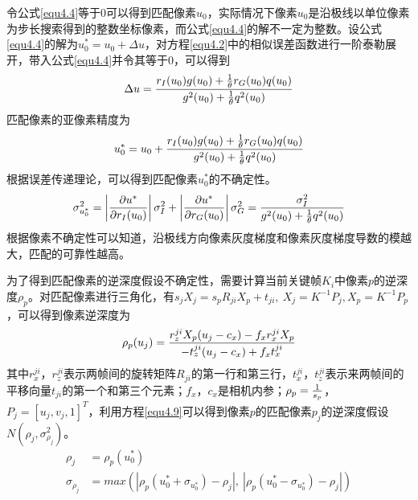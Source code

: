 令公式\eqref{equ4.4}等于$0$可以得到匹配像素$u_0$，实际情况下像素$u_0$是沿极线以单位像素为步长搜索得到的整数坐标像素，而公式\eqref{equ4.4}的解不一定为整数。设公式\eqref{equ4.4}的解为$u_0^*=u_0+\Delta u$，对方程\eqref{equ4.2}中的相似误差函数进行一阶泰勒展开，带入公式\eqref{equ4.4}并令其等于$0$，可以得到
\begin{equation}
\label{equ4.6}
\Delta u = {{ r_I(u_0) g(u_0)+ {1 \over \theta} r_G(u_0)q(u_0) } \over {g^2(u_0)+ { 1 \over \theta} q^2(u_0)}}
\end{equation}
匹配像素的亚像素精度为
\begin{equation}
\label{equ4.7}
u_0^* = u_0 + {{ r_I(u_0) g(u_0)+ {1 \over \theta} r_G(u_0)q(u_0) } \over {g^2(u_0)+ { 1 \over \theta} q^2(u_0)}}
\end{equation}
根据误差传递理论，可以得到匹配像素$u_0^*$的不确定性。
\begin{equation}
\label{equ4.8}
\sigma_{u_0^*}^2 = \left \vert { \partial u^* \over \partial r_I(u_0) }  \right \vert \sigma_I^2 + \left \vert { \partial u^* \over \partial r_G(u_0) }  \right \vert \sigma_G^2 = { \sigma_I^2 \over g^2(u_0) + {1 \over \theta} q^2(u_0) }
\end{equation}
根据像素不确定性可以知道，沿极线方向像素灰度梯度和像素灰度梯度导数的模越大，匹配的可靠性越高。

为了得到匹配像素的逆深度假设不确定性，需要计算当前关键帧$K_i$中像素$p$的逆深度$\rho_p$。对匹配像素进行三角化，有$s_jX_j = s_pR_{ji}X_p+t_{ji}, \  X_j = K^{-1}P_j, X_p = K^{-1}P_p$，可以得到像素逆深度为
\begin{equation}
\label{equ4.9}
\rho_p(u_j) = { r_z^{ji} X_p (u_j-c_x) - f_x r_x^{ji} X_p  \over - t_z^{ji}(u_j-c_x)+f_x t_x^{ji} }
\end{equation}
其中$r_x^{ji}$，$r_z^{ji}$表示两帧间的旋转矩阵$R_{ji}$的第一行和第三行，$t_x^{ji}$，$t_z^{ji}$表示来两帧间的平移向量$t_{ji}$的第一个和第三个元素；$f_x$，$c_x$是相机内参；$\rho_p = { 1 \over s_p}$，$P_j= \left [ u_j, v_j, 1 \right ] ^T$，利用方程\eqref{equ4.9}可以得到像素$p$的匹配像素$p_j$的逆深度假设$N(\rho_j, \sigma_{\rho_j}^2)$。
\begin{equation}
\label{equ4.10}
\begin{aligned}
 \rho_j &= \rho_p(u_0^*) \\ 
 \sigma_{\rho_j} &= max \left( \left \vert  \rho_p(u_0^*+\sigma_{u_0^*})-\rho_j \right \vert , \  \left \vert  \rho_p(u_0^*-\sigma_{u_0^*})-\rho_j \right \vert \right)
\end{aligned}
\end{equation}

